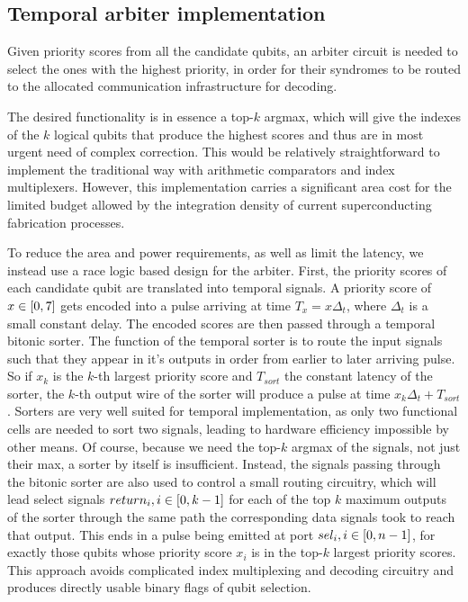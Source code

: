 \documentclass[conference]{IEEEtran}
\begin{document}
\subsection{Temporal arbiter implementation}

Given priority scores from all the candidate qubits, an
arbiter circuit is needed to select the ones with the
highest priority, in order for their syndromes to be routed
to the allocated communication infrastructure for decoding.

The desired functionality is in essence a top-$k$ argmax,
which will give the indexes of the $k$ logical qubits that
produce the highest scores and thus are in most urgent need
of complex correction. This would be relatively
straightforward to implement the traditional way with
arithmetic comparators and index multiplexers. However, this
implementation carries a significant area cost for the
limited budget allowed by the integration density of current
superconducting fabrication processes.

To reduce the area and power requirements, as well as limit
the latency, we instead use a race logic based design for
the arbiter. First, the priority scores of each candidate
qubit are translated into temporal signals. A priority score
of $x \in \interval{0}{7}$ gets encoded into a pulse
arriving at time $T_x = x {\Delta}_t$, where ${\Delta}_t$ is
a small constant delay. The encoded scores are then passed
through a temporal bitonic sorter. The function of the
temporal sorter is to route the input signals such that they
appear in it's outputs in order from earlier to later
arriving pulse. So if $x_k$ is the $k$-th largest priority
score and $T_{sort}$ the constant latency of the sorter, the
$k$-th output wire of the sorter will produce a pulse at
time $x_k {\Delta}_t + T_{sort}$. Sorters are very well
suited for temporal implementation, as only two functional
cells are needed to sort two signals, leading to hardware
efficiency impossible by other means. Of course, because we
need the top-$k$ argmax of the signals, not just their max,
a sorter by itself is insufficient. Instead, the signals
passing through the bitonic sorter are also used to control
a small routing circuitry, which will lead select signals
$return_i, i \in \interval{0}{k-1}$ for each of the top $k$
maximum outputs of the sorter through the same path the
corresponding data signals took to reach that output. This
ends in a pulse being emitted at port $sel_i, i \in
\interval{0}{n-1}$, for exactly those qubits whose priority
score $x_i$ is in the top-$k$ largest priority scores. This
approach avoids complicated index multiplexing and decoding
circuitry and produces directly usable binary flags of qubit
selection.
\end{document}
